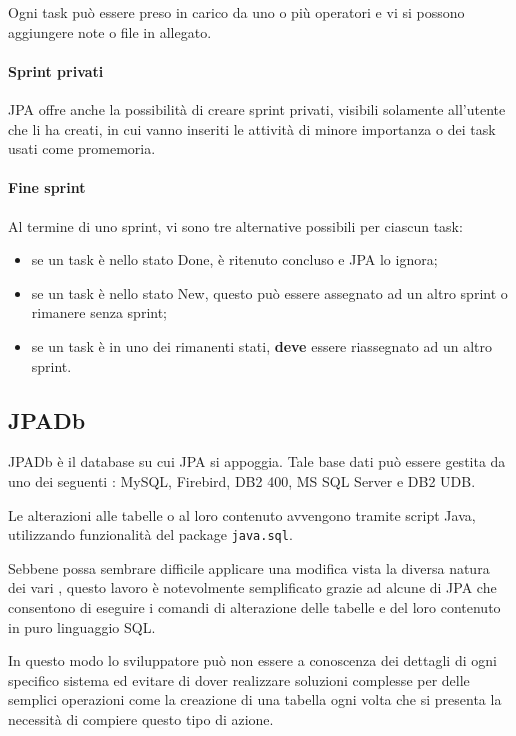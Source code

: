 Ogni task può essere preso in carico da uno o più operatori e vi si possono
aggiungere note o file in allegato.

\paragraph{Sprint privati} \mbox{}

JPA offre anche la possibilità di creare sprint privati, visibili solamente
all'utente che li ha creati, in cui vanno inseriti le attività di minore
importanza o dei task usati come promemoria.

\paragraph{Fine sprint} \mbox{}

Al termine di uno sprint, vi sono tre alternative possibili per ciascun task:

\begin{itemize}
	\item se un task è nello stato Done, è ritenuto concluso e JPA lo ignora;
	\item se un task è nello stato New, questo può essere assegnato ad un altro
	sprint o rimanere senza sprint;
	\item se un task è in uno dei rimanenti stati, \textbf{deve} essere
	riassegnato ad un altro sprint.
\end{itemize}

\subsection{JPADb}

JPADb è il database su cui JPA si appoggia. Tale base dati può essere gestita
da uno dei seguenti : MySQL, Firebird, DB2 400, MS SQL Server e DB2
UDB.

Le alterazioni alle tabelle o al loro contenuto avvengono tramite script Java,
utilizzando funzionalità del package \texttt{java.sql}.

Sebbene possa sembrare difficile applicare una modifica vista la diversa natura
dei vari , questo lavoro è notevolmente semplificato grazie ad
alcune  di JPA che consentono di eseguire i comandi di alterazione
delle tabelle e del loro contenuto in puro linguaggio SQL.

In questo modo lo sviluppatore può non essere a conoscenza dei dettagli di ogni
specifico sistema ed evitare di dover realizzare soluzioni complesse per delle
semplici operazioni come la creazione di una tabella ogni volta che si presenta
la necessità di compiere questo tipo di azione.


